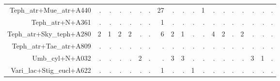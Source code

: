 \documentclass[a4paper, 11]{article}\usepackage[]{graphicx}\usepackage[]{color}
\begin{document}
\begin{table}
\begin{tabular}{rrrrrrrrrrrrrrrrrrr}
  Teph\_atr+Mue\_atr+A440 & . & . & . & . & . & . & 27 & . & . & . & 1 & . & . & . & . & . & . & . \\ 
  Teph\_atr+N+A361 & . & . & . & . & . & . & 1 & . & . & . & . & . & . & . & . & . & . & . \\ 
  Teph\_atr+Sky\_teph+A280 & 2 & 1 & 2 & 2 & . & . & 6 & 2 & 1 & . & . & 4 & 2 & . & 2 & . & . & . \\ 
  Teph\_atr+Tae\_atr+A809 & . & . & . & . & . & . & . & . & . & . & . & . & . & . & . & . & . & . \\ 
  Umb\_cyl+N+A032 & . & . & . & . & 2 & . & . & 3 & 3 & . & . & . & . & . & . & 3 & 1 & . \\ 
  Vari\_lac+Stig\_eucl+A622 & . & . & . & . & . & . & 1 & . & . & 1 & . & . & . & . & . & . & . & . \\ 
   \hline
\end{tabular}
\end{table}
\end{document}
